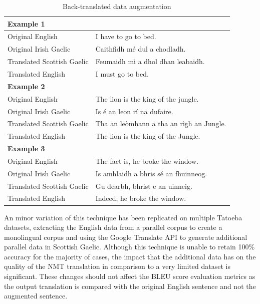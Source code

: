 \begin{table}[!ht]
\centering
\renewcommand{\arraystretch}{1.1}
\begin{tabular}{|l|l|}
\hline
\multicolumn{2}{|l|}{\textbf{Example 1}}                              \\ \hline
Original English           & I have to go to bed.                     \\ \hline
Original Irish Gaelic      & Caithfidh mé dul a chodladh.             \\ \hline
Translated Scottish Gaelic & Feumaidh mi a dhol dhan leabaidh.        \\ \hline
Translated English         & I must go to bed.                        \\ \hline
\multicolumn{2}{|l|}{\textbf{Example 2}}                              \\ \hline
Original English           & The lion is the king of the jungle.      \\ \hline
Original Irish Gaelic      & Is é an leon rí na dufaire.              \\ \hline
Translated Scottish Gaelic & Tha an leòmhann a tha an rìgh an Jungle. \\ \hline
Translated English         & The lion is the king of the Jungle.      \\ \hline
\multicolumn{2}{|l|}{\textbf{Example 3}}                              \\ \hline
Original English           & The fact is, he broke the window.        \\ \hline
Original Irish Gaelic      & Is amhlaidh a bhris sé an fhuinneog.     \\ \hline
Translated Scottish Gaelic & Gu dearbh, bhrist e an uinneig.          \\ \hline
Translated English         & Indeed, he broke the window.             \\ \hline
\end{tabular}
\captionsetup{justification=centering,font=Large}
\caption{Back-translated data augmentation}
\label{tab:back_translated-data}
\end{table}

An minor variation of this technique has been replicated on multiple Tatoeba datasets, extracting the English data from a parallel corpus to create a monolingual corpus and using the Google Translate API to generate additional parallel data in Scottish Gaelic. Although this technique is unable to retain 100\% accuracy for the majority of cases, the impact that the additional data has on the quality of the \acrshort{NMT} translation in comparison to a very limited dataset is significant. These changes should not affect the BLEU score evaluation metrics as the output translation is compared with the original English sentence and not the augmented sentence.


